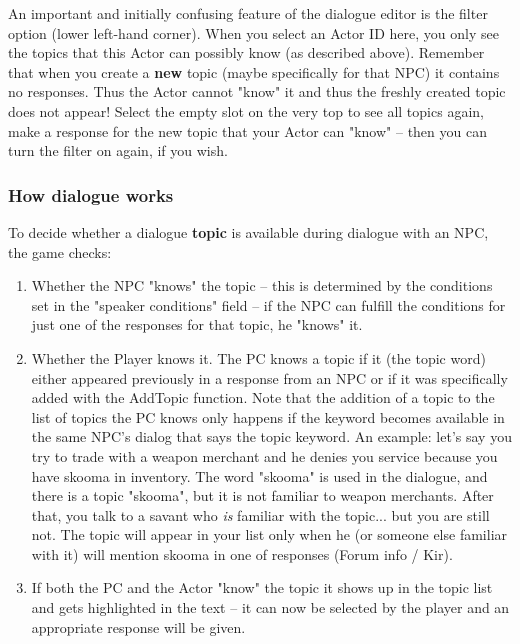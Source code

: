\documentclass[
]{article}
\begin{document}
An important and initially confusing feature of the dialogue editor is
the filter option (lower left-hand corner). When you select an Actor ID
here, you only see the topics that this Actor can possibly know (as
described above). Remember that when you create a \textbf{new} topic
(maybe specifically for that NPC) it contains no responses. Thus the
Actor cannot "know" it and thus the freshly created topic does not
appear! Select the empty slot on the very top to see all topics again,
make a response for the new topic that your Actor can "know" -- then you
can turn the filter on again, if you wish.

\hypertarget{how-dialogue-works}{%
\subsubsection{How dialogue works}\label{how-dialogue-works}}

To decide whether a dialogue \textbf{topic} is available during dialogue
with an NPC, the game checks:

\begin{enumerate}
\def\labelenumi{\arabic{enumi}.}
\item
  Whether the NPC "knows" the topic -- this is determined by the
  conditions set in the "speaker conditions" field -- if the NPC can
  fulfill the conditions for just one of the responses for that topic,
  he "knows" it.
\item
  Whether the Player knows it. The PC knows a topic if it (the topic
  word) either appeared previously in a response from an NPC or if it
  was specifically added with the AddTopic function. Note that the
  addition of a topic to the list of topics the PC knows only happens if
  the keyword becomes available in the same NPC's dialog that says the
  topic keyword. An example: let's say you try to trade with a weapon
  merchant and he denies you service because you have skooma in
  inventory. The word "skooma" is used in the dialogue, and there is a
  topic "skooma", but it is not familiar to weapon merchants. After
  that, you talk to a savant who \emph{is} familiar with the topic...
  but you are still not. The topic will appear in your list only when he
  (or someone else familiar with it) will mention skooma in one of
  responses (Forum info / Kir).
\item
  If both the PC and the Actor "know" the topic it shows up in the topic
  list and gets highlighted in the text -- it can now be selected by the
  player and an appropriate response will be given.
\end{enumerate}
\end{document}
